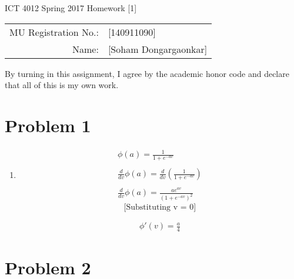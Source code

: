\documentclass[12pt]{article}
\begin{document}
\begin{center}
{\Large ICT 4012 Spring 2017 Homework [1]} %

\begin{tabular}{rl}
MU Registration No.: & [140911090] \\  %
Name: & [Soham Dongargaonkar] \\   %
\end{tabular}
\end{center}

By turning in this assignment, I agree by the academic honor code and declare that all of this is my own work.

\section*{Problem 1}

\begin{enumerate}
    \item \begin{gather}
                \phi(a) =  \frac{1}{1+e^{-av}} \nonumber\\ \nonumber\\
                \frac{d}{dv}\phi(a) = \frac{d}{dv}(\frac{1}{1+e^{-av}})\nonumber\\\nonumber\\
                \frac{d}{dv}\phi(a) = \frac{ae^{av}}{(1+e^{-av})^2} \label{eqn:1}
            \end{gather}
            \[ 
                \text{[Substituting\ v = 0]} 
            \]
             
            \begin{gather}
                \phi'(v) = \frac{a}{4}
            \end{gather}  
               

   
\end{enumerate}

\section*{Problem 2}
\end{document}
